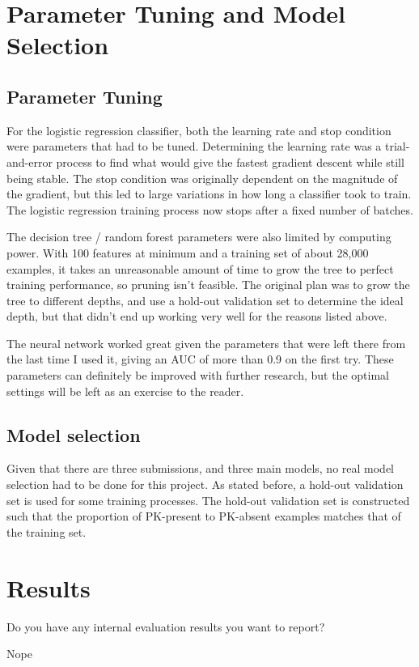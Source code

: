 \documentclass[10pt,a4paper]{article}
\begin{document}
\section{Parameter Tuning and Model Selection }
\subsection{Parameter Tuning}
For the logistic regression classifier, both the learning rate and stop condition were parameters that had to be tuned. Determining the learning rate was a trial-and-error process to find what would give the fastest gradient descent while still being stable. The stop condition was originally dependent on the magnitude of the gradient, but this led to large variations in how long a classifier took to train. The logistic regression training process now stops after a fixed number of batches. 

The decision tree / random forest parameters were also limited by computing power. With 100 features at minimum and a training set of about 28,000 examples, it takes an unreasonable amount of time to grow the tree to perfect training performance, so pruning isn't feasible. The original plan was to grow the tree to different depths, and use a hold-out validation set to determine the ideal depth, but that didn't end up working very well for the reasons listed above.

The neural network worked great given the parameters that were left there from the last time I used it, giving an AUC of more than 0.9 on the first try. These parameters can definitely be improved with further research, but the optimal settings will be left as an exercise to the reader.

\subsection{Model selection}
Given that there are three submissions, and three main models, no real model selection had to be done for this project. As stated before, a hold-out validation set is used for some training processes. The hold-out validation set is constructed such that the proportion of PK-present to PK-absent examples matches that of the training set. 

\section{Results}
Do you have any internal evaluation results you want to report?

Nope
\end{document}
